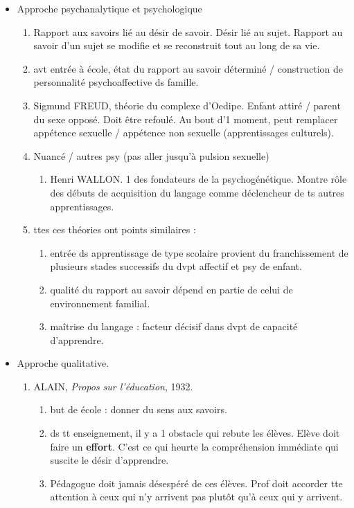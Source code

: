 \documentclass[12pt]{report}
\begin{document}
\begin{itemize}
\begin{itemize}
\item Approche psychanalytique et psychologique
\begin{enumerate}
\item Rapport aux savoirs lié au désir de savoir. Désir lié au sujet. Rapport au savoir d'un sujet se modifie et se reconstruit tout au long de sa vie.\\
\item avt entrée à école, état du rapport au savoir déterminé / construction de personnalité psychoaffective ds famille.\\
\item Sigmund FREUD, théorie du complexe d'Oedipe. Enfant attiré / parent du sexe opposé. Doit être refoulé. Au bout d'1 moment, peut remplacer appétence sexuelle / appétence non sexuelle (apprentissages culturels). \\
\item Nuancé / autres psy (pas aller jusqu'à pulsion sexuelle)
\begin{enumerate}
\item Henri WALLON. 1 des fondateurs de la psychogénétique. Montre rôle des débuts de acquisition du langage comme déclencheur de ts autres apprentissages. \\
\end{enumerate}
\item ttes ces théories ont points similaires : 
\begin{enumerate}
\item entrée ds apprentissage de type scolaire provient du franchissement de plusieurs stades successifs du dvpt affectif et psy de enfant.\\
\item qualité du rapport au savoir dépend en partie de celui de environnement familial.\\
\item maîtrise du langage : facteur décisif dans dvpt de capacité d'apprendre.\\
\end{enumerate}
\end{enumerate}

\item Approche qualitative.
\begin{enumerate}
\item ALAIN, \textit{Propos sur l'éducation}, 1932. 
\begin{enumerate}
\item but de école : donner du sens aux savoirs.\\
\item ds tt enseignement, il y a 1 obstacle qui rebute les élèves. Elève doit faire un \textbf{effort}. C'est ce qui heurte la compréhension immédiate qui suscite le désir d'apprendre.
\item Pédagogue doit jamais désespéré de ces élèves. Prof doit accorder tte attention à ceux qui n'y arrivent pas plutôt qu'à ceux qui y arrivent. \\
\end{enumerate}
\end{enumerate}


\end{itemize}
\end{itemize}
\end{document}
